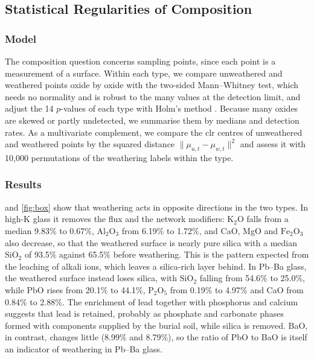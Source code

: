 \documentclass[11pt,a4paper]{article}
\newcommand{\ox}[1]{\ensuremath{\mathrm{#1}}}
\begin{document}
\subsection{Statistical Regularities of Composition}

\subsubsection{Model}
The composition question concerns sampling points, since each point is a measurement of a surface.
Within each type, we compare unweathered and weathered points oxide by oxide with the two-sided Mann--Whitney test, which needs no normality and is robust to the many values at the detection limit, and adjust the 14 $p$-values of each type with Holm's method \citep{holm1979}.
Because many oxides are skewed or partly undetected, we summarise them by medians and detection rates.
As a multivariate complement, we compare the clr centres of unweathered and weathered points by the squared distance $\lVert\mu_{u,t}-\mu_{w,t}\rVert^2$ and assess it with 10{,}000 permutations of the weathering labels within the type.

\subsubsection{Results}
 and \cref{fig:box} show that weathering acts in opposite directions in the two types.
In high-K glass it removes the flux and the network modifiers: \ox{K_2O} falls from a median 9.83\% to 0.67\%, \ox{Al_2O_3} from 6.19\% to 1.72\%, and CaO, MgO and \ox{Fe_2O_3} also decrease, so that the weathered surface is nearly pure silica with a median \ox{SiO_2} of 93.5\% against 65.5\% before weathering.
This is the pattern expected from the leaching of alkali ions, which leaves a silica-rich layer behind.
In Pb--Ba glass, the weathered surface instead loses silica, with \ox{SiO_2} falling from 54.6\% to 25.0\%, while PbO rises from 20.1\% to 44.1\%, \ox{P_2O_5} from 0.19\% to 4.97\% and CaO from 0.84\% to 2.88\%.
The enrichment of lead together with phosphorus and calcium suggests that lead is retained, probably as phosphate and carbonate phases formed with components supplied by the burial soil, while silica is removed.
BaO, in contrast, changes little (8.99\% and 8.79\%), so the ratio of PbO to BaO is itself an indicator of weathering in Pb--Ba glass.
\end{document}
